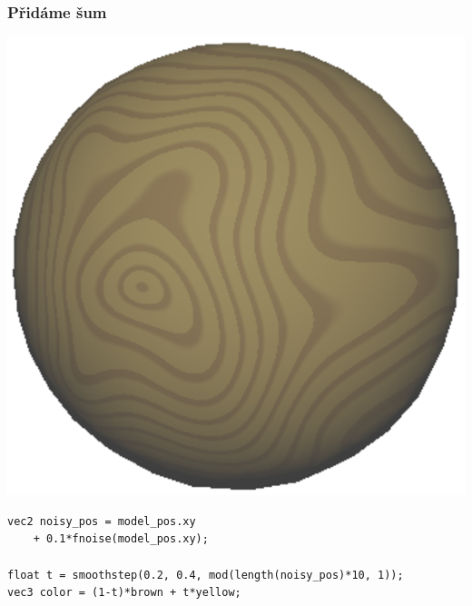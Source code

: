 \begin{frame}[fragile]
    \frametitle{Přidáme šum}
    \includegraphics[width=.6\textwidth]{pics/procedural/drevo.eps}

  \begin{verbatim}
vec2 noisy_pos = model_pos.xy
    + 0.1*fnoise(model_pos.xy);

float t = smoothstep(0.2, 0.4, mod(length(noisy_pos)*10, 1));
vec3 color = (1-t)*brown + t*yellow;
  \end{verbatim}
\end{frame}

